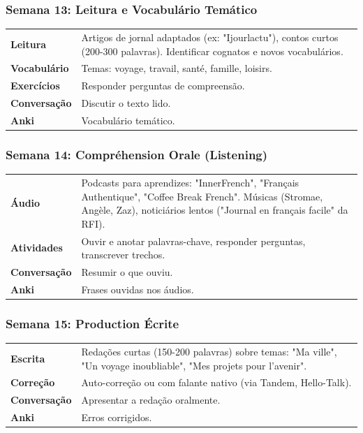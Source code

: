 \documentclass[a4paper,12pt]{article}
\begin{document}
\subsubsection*{Semana 13: Leitura e Vocabulário Temático}
\begin{tabularx}{\linewidth}{>{\bfseries}l L}
    Leitura & Artigos de jornal adaptados (ex: "Ijourlactu"), contos curtos (200-300 palavras). Identificar cognatos e novos vocabulários. \\
    Vocabulário & Temas: voyage, travail, santé, famille, loisirs. \\
    Exercícios & Responder perguntas de compreensão. \\
    Conversação & Discutir o texto lido. \\
    Anki & Vocabulário temático. \\
\end{tabularx}

\subsubsection*{Semana 14: Compréhension Orale (Listening)}
\begin{tabularx}{\linewidth}{>{\bfseries}l L}
    Áudio & Podcasts para aprendizes: "InnerFrench", "Français Authentique", "Coffee Break French". Músicas (Stromae, Angèle, Zaz), noticiários lentos ("Journal en français facile" da RFI). \\
    Atividades & Ouvir e anotar palavras-chave, responder perguntas, transcrever trechos. \\
    Conversação & Resumir o que ouviu. \\
    Anki & Frases ouvidas nos áudios. \\
\end{tabularx}

\subsubsection*{Semana 15: Production Écrite}
\begin{tabularx}{\linewidth}{>{\bfseries}l L}
    Escrita & Redações curtas (150-200 palavras) sobre temas: "Ma ville", "Un voyage inoubliable", "Mes projets pour l'avenir". \\
    Correção & Auto-correção ou com falante nativo (via Tandem, Hello-Talk). \\
    Conversação & Apresentar a redação oralmente. \\
    Anki & Erros corrigidos. \\
\end{tabularx}
\end{document}
